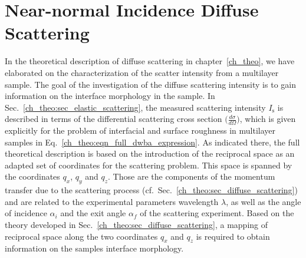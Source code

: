 \section{Near-normal Incidence Diffuse Scattering} \label{ch_diff:sec_PTB17}
In the theoretical description of diffuse scattering in chapter~\ref{ch_theo}, we have elaborated on the characterization of the scatter intensity from a multilayer sample. The goal of the investigation of the diffuse scattering intensity is to gain information on the interface morphology in the sample. In Sec.~\ref{ch_theo:sec_elastic_scattering}, the measured scattering intensity $I_\text{s}$ is described in terms of the differential scattering cross section $\big(\frac{d \sigma}{d \Omega}\big)$, which is given explicitly for the problem of interfacial and surface roughness in multilayer samples in Eq.~\eqref{ch_theo:eqn_full_dwba_expression}. As indicated there, the full theoretical description is based on the introduction of the reciprocal space as an adapted set of coordinates for the scattering problem. This space is spanned by the coordinates $q_x$, $q_y$ and $q_z$. Those are the components of the momentum transfer due to the scattering process (cf.~Sec.~\ref{ch_theo:sec_diffuse_scattering}) and are related to the experimental parameters wavelength $\lambda$, as well as the angle of incidence $\alpha_i$ and the exit angle $\alpha_f$ of the scattering experiment. Based on the theory developed in Sec.~\ref{ch_theo:sec_diffuse_scattering}, a mapping of reciprocal space along the two coordinates $q_x$ and $q_z$ is required to obtain information on the samples interface morphology.

